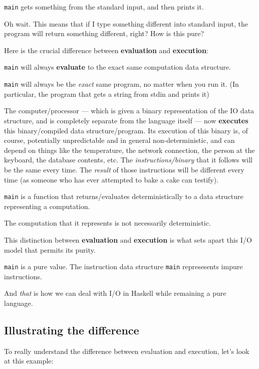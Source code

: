 \documentclass[]{article}
\begin{document}
\texttt{main} gets something from the standard input, and then prints it.

Oh wait. This means that if I type something different into standard input, the
program will return something different, right? How is this pure?

Here is the crucial difference between \textbf{evaluation} and
\textbf{execution}:

\texttt{main} will always \textbf{evaluate} to the exact same computation data
structure.

\texttt{main} will always be the \emph{exact} same program, no matter when you
run it. (In particular, the program that gets a string from stdin and prints it)

The computer/processor --- which is given a binary representation of the IO data
structure, and is completely separate from the language itself --- now
\textbf{executes} this binary/compiled data structure/program. Its execution of
this binary is, of course, potentially unpredictable and in general
non-deterministic, and can depend on things like the temperature, the network
connection, the person at the keyboard, the database contents, etc. The
\emph{instructions/binary} that it follows will be the same every time. The
\emph{result} of those instructions will be different every time (as someone who
has ever attempted to bake a cake can testify).

\texttt{main} is a function that returns/evaluates deterministically to a data
structure representing a computation.

The computation that it represents is not necessarily deterministic.

This distinction between \textbf{evaluation} and \textbf{execution} is what sets
apart this I/O model that permits its purity.

\texttt{main} is a pure value. The instruction data structure \texttt{main}
represesents impure instructions.

And \emph{that} is how we can deal with I/O in Haskell while remaining a pure
language.

\hypertarget{illustrating-the-difference}{%
\subsection{Illustrating the difference}\label{illustrating-the-difference}}

To really understand the difference between evaluation and execution, let's look
at this example:
\end{document}

